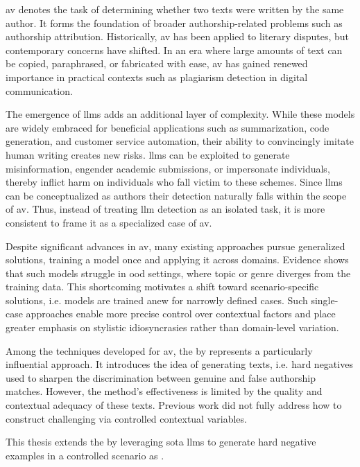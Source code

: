\Acf{av} denotes the task of determining whether two texts were written by the same author. 
It forms the foundation of broader authorship-related problems such as authorship attribution. 
Historically, \ac{av} has been applied to literary disputes, but contemporary concerns have shifted. 
In an era where large amounts of text can be copied, paraphrased, or fabricated with ease, \ac{av} has gained renewed importance in practical contexts such as plagiarism detection in digital communication.

The emergence of \acp{llm} adds an additional layer of complexity. 
While these models are widely embraced for beneficial applications such as summarization, code generation, and customer service automation, their ability to convincingly imitate human writing creates new risks. 
\acp{llm} can be exploited to generate misinformation, engender academic submissions, or impersonate individuals, thereby inflict harm on individuals who fall victim to these schemes. 
Since \acp{llm} can be conceptualized as authors their detection naturally falls within the scope of \ac{av}. 
Thus, instead of treating \ac{llm} detection as an isolated task, it is more consistent to frame it as a specialized case of \ac{av}.

Despite significant advances in \ac{av}, many existing approaches pursue generalized solutions, training a model once and applying it across domains. 
Evidence shows that such models struggle in \ac{ood} settings, where topic or genre diverges from the training data. 
This shortcoming motivates a shift toward scenario-specific solutions, i.e. models are trained anew for narrowly defined cases. 
Such single-case approaches enable more precise control over contextual factors and place greater emphasis on stylistic idiosyncrasies rather than domain-level variation.

Among the techniques developed for \ac{av}, the \impAppr{} by \citet{koppel_determining_2014} represents a particularly influential approach. 
It introduces the idea of generating \imp{} texts, i.e. hard negatives used to sharpen the discrimination between genuine and false authorship matches. 
However, the method's effectiveness is limited by the quality and contextual adequacy of these \imp{} texts. 
Previous work did not fully address how to construct challenging \imps{} via controlled contextual variables.

This thesis extends the \impAppr{} by leveraging \acl{sota} \acp{llm} to generate hard negative examples in a controlled scenario as \imps{}. 

